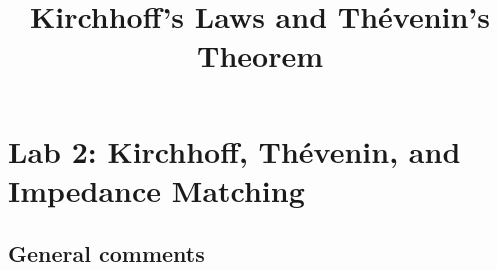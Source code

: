 \documentclass{article}
\title{Kirchhoff's Laws and Th\'{e}venin's Theorem}
\begin{document}
\maketitle

\section{Lab 2: Kirchhoff, Th\'{e}venin, and Impedance Matching}

\subsection*{General comments}
\end{document}
